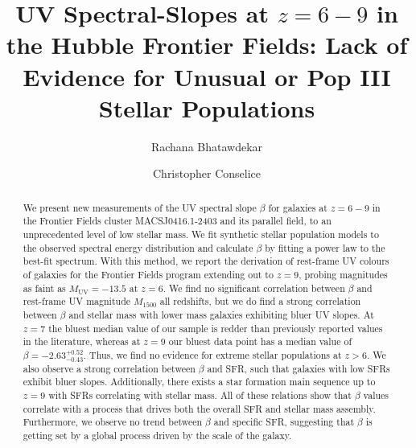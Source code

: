 \documentclass[twocolumn]{aastex63}
\begin{document}
\title{UV Spectral-Slopes at $z=6-9$ in the Hubble Frontier Fields: Lack of Evidence for Unusual or Pop III Stellar Populations}



\author[0000-0003-0883-2226]{Rachana Bhatawdekar}

\author[0000-0003-1949-7638]{Christopher Conselice}

\begin{abstract}

We present new measurements of the UV spectral slope $\beta$ for galaxies at $z=6-9$ in the Frontier Fields cluster MACSJ0416.1-2403 and its parallel field, to an unprecedented level of low stellar mass. We fit synthetic stellar population models to the observed spectral energy distribution and calculate $\beta$ by fitting a power law to the best-fit spectrum. With this method, we report the derivation of rest-frame UV colours of galaxies for the Frontier Fields program extending out to $z=9$, probing magnitudes as faint as $M\mathrm{_{UV}=-13.5}$ at $z=6$. We find no significant correlation between $\beta$ and rest-frame UV magnitude $M_{1500}$ all redshifts, but we do find a strong correlation between $\beta$ and stellar mass with lower mass galaxies exhibiting bluer UV slopes. At $z=7$ the bluest median value of our sample is redder than previously reported values in the literature, whereas at $z=9$ our bluest data point has a median value of $\beta=-2.63_{-0.43}^{+0.52}$. Thus, we find no evidence for extreme stellar populations at $z>6$. We also observe a strong correlation between $\beta$ and SFR, such that galaxies with low SFRs exhibit bluer slopes. Additionally, there exists a star formation main sequence up to $z = 9$ with SFRs correlating with stellar mass. All of these relations show that $\beta$ values correlate with a process that drives both the overall SFR and stellar mass assembly. Furthermore, we observe no trend between $\beta$ and specific SFR, suggesting that $\beta$ is getting set by a global process driven by the scale of the galaxy.

\end{abstract}
\end{document}
